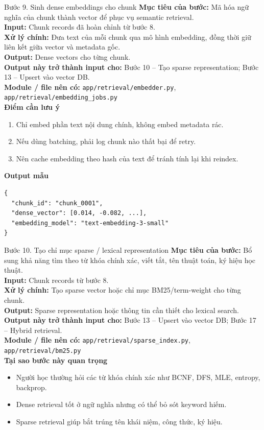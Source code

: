 \documentclass[12pt,a4paper]{article}
\newcommand{\stepgoal}[1]{\textbf{Mục tiêu của bước:} #1\\}
\newcommand{\stepinput}[1]{\textbf{Input:} #1\\}
\newcommand{\stepprocess}[1]{\textbf{Xử lý chính:} #1\\}
\newcommand{\stepoutput}[1]{\textbf{Output:} #1\\}
\newcommand{\stepnext}[1]{\textbf{Output này trở thành input cho:} #1\\}
\newcommand{\stepmodules}[1]{\textbf{Module / file nên có:} #1\\}
\begin{document}
\begin{stepbox}{Bước 9. Sinh dense embeddings cho chunk}
\stepgoal{Mã hóa ngữ nghĩa của chunk thành vector để phục vụ semantic retrieval.}
\stepinput{Chunk records đã hoàn chỉnh từ bước 8.}
\stepprocess{Đưa text của mỗi chunk qua mô hình embedding, đồng thời giữ liên kết giữa vector và metadata gốc.}
\stepoutput{Dense vectors cho từng chunk.}
\stepnext{Bước 10 -- Tạo sparse representation; Bước 13 -- Upsert vào vector DB.}
\stepmodules{\texttt{app/retrieval/embedder.py}, \texttt{app/retrieval/embedding\_jobs.py}}

\textbf{Điểm cần lưu ý}
\begin{enumerate}[label=\arabic*.]
    \item Chỉ embed phần text nội dung chính, không embed metadata rác.
    \item Nếu dùng batching, phải log chunk nào thất bại để retry.
    \item Nên cache embedding theo hash của text để tránh tính lại khi reindex.
\end{enumerate}

\textbf{Output mẫu}
\begin{lstlisting}
{
  "chunk_id": "chunk_0001",
  "dense_vector": [0.014, -0.082, ...],
  "embedding_model": "text-embedding-3-small"
}
\end{lstlisting}
\end{stepbox}

\begin{stepbox}{Bước 10. Tạo chỉ mục sparse / lexical representation}
\stepgoal{Bổ sung khả năng tìm theo từ khóa chính xác, viết tắt, tên thuật toán, ký hiệu học thuật.}
\stepinput{Chunk records từ bước 8.}
\stepprocess{Tạo sparse vector hoặc chỉ mục BM25/term-weight cho từng chunk.}
\stepoutput{Sparse representation hoặc thông tin cần thiết cho lexical search.}
\stepnext{Bước 13 -- Upsert vào vector DB; Bước 17 -- Hybrid retrieval.}
\stepmodules{\texttt{app/retrieval/sparse\_index.py}, \texttt{app/retrieval/bm25.py}}

\textbf{Tại sao bước này quan trọng}
\begin{itemize}
    \item Người học thường hỏi các từ khóa chính xác như BCNF, DFS, MLE, entropy, backprop.
    \item Dense retrieval tốt ở ngữ nghĩa nhưng có thể bỏ sót keyword hiếm.
    \item Sparse retrieval giúp bắt trúng tên khái niệm, công thức, ký hiệu.
\end{itemize}
\end{stepbox}
\end{document}
